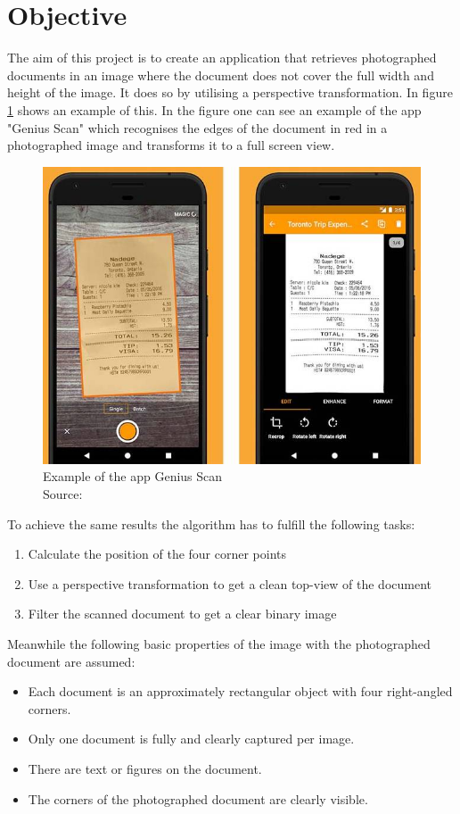 \section{Objective}

The aim of this project is to create an application that retrieves photographed documents in an image where the document does not cover the full width and height of the image. It does so by utilising a perspective transformation. In figure \ref{fig:genius} shows an example of this. In the figure one can see an example of the app "Genius Scan" which recognises the edges of the document in red in a photographed image and transforms it to a full screen view.

\begin{figure}[H]
    \centering
    \includegraphics[width=.6\textwidth]{images/Genius-Scan-screenshot-2018.jpg}
    \caption{Example of the app Genius Scan\\Source: \citep{genius}}
    \label{fig:genius}
\end{figure}

To achieve the same results the algorithm has to fulfill the following tasks:
\begin{enumerate}
    \item Calculate the position of the four corner points
    \item Use a perspective transformation to get a clean top-view of the document
    \item Filter the scanned document to get a clear binary image
\end{enumerate}

\vspace{\lineskip}

Meanwhile the following basic properties of the image with the photographed document are assumed:
\begin{itemize}[leftmargin=0.9cm]
    \item Each document is an approximately rectangular object with four right-angled corners.
    \item Only one document is fully and clearly captured per image.
    \item There are text or figures on the document.
    \item The corners of the photographed document are clearly visible.
\end{itemize}



